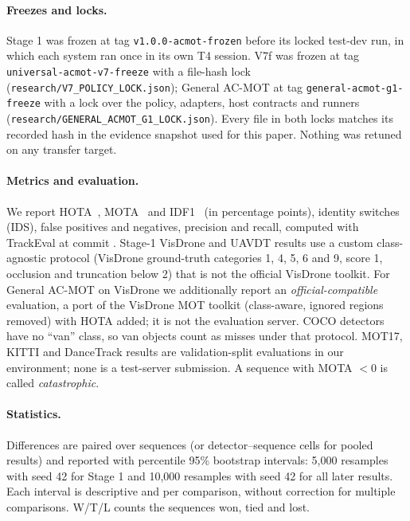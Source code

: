 \documentclass[pdflatex,sn-mathphys-num]{sn-jnl}
\begin{document}


\paragraph{Freezes and locks.} Stage 1 was frozen at tag \texttt{v1.0.0-acmot-frozen} before its locked test-dev run, in which each system ran once in its own T4 session. V7f was frozen at tag \texttt{universal-acmot-v7-freeze} with a file-hash lock (\texttt{research/V7\_POLICY\_LOCK.json}); General AC-MOT at tag \texttt{general-acmot-g1-freeze} with a lock over the policy, adapters, host contracts and runners (\texttt{research/GENERAL\_ACMOT\_G1\_LOCK.json}). Every file in both locks matches its recorded hash in the evidence snapshot used for this paper. Nothing was retuned on any transfer target.

\paragraph{Metrics and evaluation.} We report HOTA~\cite{luiten2021hota}, MOTA~\cite{bernardin2008clear} and IDF1~\cite{ristani2016idf1} (in percentage points), identity switches (IDS), false positives and negatives, precision and recall, computed with TrackEval at commit \texttt{}. Stage-1 VisDrone and UAVDT results use a custom class-agnostic protocol (VisDrone ground-truth categories 1, 4, 5, 6 and 9, score 1, occlusion and truncation below 2) that is not the official VisDrone toolkit. For General AC-MOT on VisDrone we additionally report an \emph{official-compatible} evaluation, a port of the VisDrone MOT toolkit (class-aware, ignored regions removed) with HOTA added; it is not the evaluation server. COCO detectors have no ``van'' class, so van objects count as misses under that protocol. MOT17, KITTI and DanceTrack results are validation-split evaluations in our environment; none is a test-server submission. A sequence with MOTA $<0$ is called \emph{catastrophic}.

\paragraph{Statistics.} Differences are paired over sequences (or detector--sequence cells for pooled results) and reported with percentile 95\% bootstrap intervals: 5,000 resamples with seed 42 for Stage 1 and 10,000 resamples with seed 42 for all later results. Each interval is descriptive and per comparison, without correction for multiple comparisons. W/T/L counts the sequences won, tied and lost.
\end{document}

